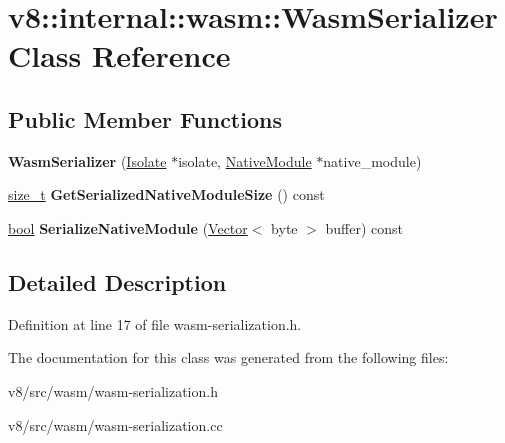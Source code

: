 \hypertarget{classv8_1_1internal_1_1wasm_1_1WasmSerializer}{}\section{v8\+:\+:internal\+:\+:wasm\+:\+:Wasm\+Serializer Class Reference}
\label{classv8_1_1internal_1_1wasm_1_1WasmSerializer}
\subsection*{Public Member Functions}
\begin{DoxyCompactItemize}
\item 
\mbox{\label{classv8_1_1internal_1_1wasm_1_1WasmSerializer_a3e5a271662016d68cfb5cdd73dba551f}} 
{\bfseries Wasm\+Serializer} (\mbox{\hyperlink{classv8_1_1internal_1_1Isolate}{Isolate}} $\ast$isolate, \mbox{\hyperlink{classv8_1_1internal_1_1wasm_1_1NativeModule}{Native\+Module}} $\ast$native\+\_\+module)
\item 
\mbox{\label{classv8_1_1internal_1_1wasm_1_1WasmSerializer_ad5372741d4ea6dbc5fa3c0f61079ea4a}} 
\mbox{\hyperlink{classsize__t}{size\+\_\+t}} {\bfseries Get\+Serialized\+Native\+Module\+Size} () const
\item 
\mbox{\label{classv8_1_1internal_1_1wasm_1_1WasmSerializer_a06340538bf667db1d40603f3604a3dde}} 
\mbox{\hyperlink{classbool}{bool}} {\bfseries Serialize\+Native\+Module} (\mbox{\hyperlink{classv8_1_1internal_1_1Vector}{Vector}}$<$ byte $>$ buffer) const
\end{DoxyCompactItemize}


\subsection{Detailed Description}


Definition at line 17 of file wasm-\/serialization.\+h.



The documentation for this class was generated from the following files\+:\begin{DoxyCompactItemize}
\item 
v8/src/wasm/wasm-\/serialization.\+h\item 
v8/src/wasm/wasm-\/serialization.\+cc\end{DoxyCompactItemize}
